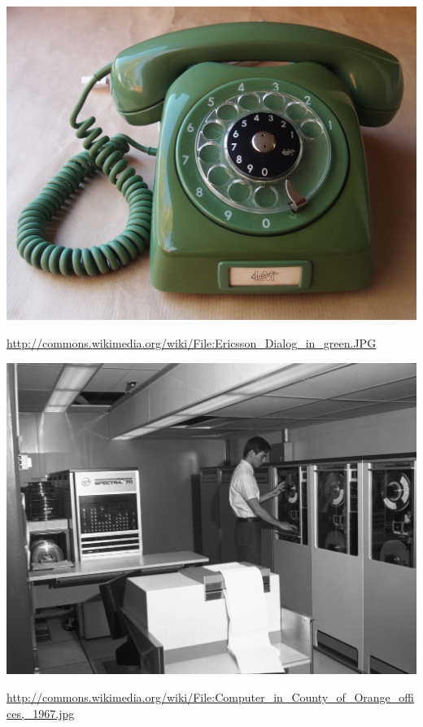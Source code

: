 \documentclass[aspectratio=169]{beamer}
\begin{document}
\begin{frame}

\begin{center}
\includegraphics[height=0.8\textheight]{figures/Ericsson_Dialog_in_green}
\end{center}

\vfill
\tiny{\url{http://commons.wikimedia.org/wiki/File:Ericsson_Dialog_in_green.JPG}}

\end{frame}
\begin{frame}

\begin{center}
\includegraphics[height=0.8\textheight]{figures/Computer_in_County_of_Orange_offices,_1967}
\end{center}

\vfill
\tiny{\url{http://commons.wikimedia.org/wiki/File:Computer_in_County_of_Orange_offices,_1967.jpg}}

\end{frame}
\end{document}
